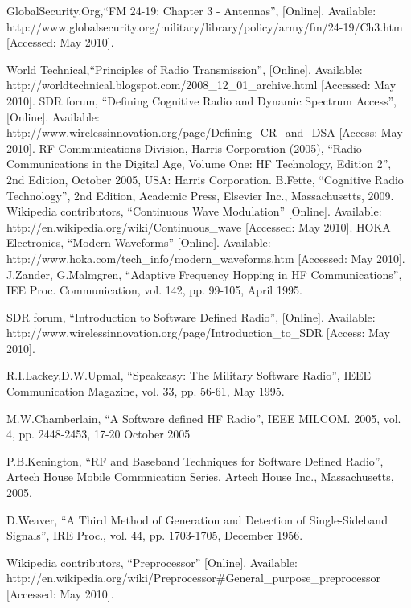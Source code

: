 \documentclass[conference]{IEEEtran}
\begin{document}
%
%
%
\begin{thebibliography}{1}

\bibitem
GlobalSecurity.Org,“FM 24-19: Chapter 3 - Antennas”, [Online]. Available: http://www.globalsecurity.org/military/library/policy/army/fm/24-19/Ch3.htm [Accessed: May 2010].

\bibitem
World Technical,“Principles of Radio Transmission”, [Online]. Available: 
http://worldtechnical.blogspot.com/2008\_12\_01\_archive.html [Accessed: May 2010]. 
\bibitem
SDR forum, “Defining Cognitive Radio and Dynamic Spectrum Access”, [Online]. Available: http://www.wirelessinnovation.org/page/Defining\_CR\_and\_DSA   [Access: May 2010].
\bibitem
RF Communications Division, Harris Corporation (2005), “Radio Communications in the Digital Age, Volume One: HF Technology, Edition 2”, 2nd Edition, October 2005, USA: Harris Corporation.
\bibitem
B.Fette, “Cognitive Radio Technology”, 2nd Edition, Academic Press, Elsevier Inc., Massachusetts, 2009.
\bibitem
Wikipedia contributors, “Continuous Wave Modulation” [Online]. Available: http://en.wikipedia.org/wiki/Continuous\_wave [Accessed: May 2010]. 
\bibitem
HOKA Electronics, “Modern Waveforms” [Online]. Available: http://www.hoka.com/tech\_info/modern\_waveforms.htm [Accessed: May 2010].
\bibitem
J.Zander, G.Malmgren, “Adaptive Frequency Hopping in HF Communications”, IEE Proc. Communication, vol. 142, pp. 99-105, April 1995. 

\bibitem
SDR forum, “Introduction to Software Defined Radio”, [Online]. Available: http://www.wirelessinnovation.org/page/Introduction\_to\_SDR  [Access: May 2010].

\bibitem
R.I.Lackey,D.W.Upmal, “Speakeasy: The Military Software Radio”, IEEE Communication Magazine, vol. 33, pp. 56-61, May 1995.  

\bibitem
M.W.Chamberlain, “A Software defined HF Radio”, IEEE MILCOM. 2005, vol. 4, pp. 2448-2453, 17-20 October 2005 

\bibitem
P.B.Kenington, “RF and Baseband Techniques for Software Defined Radio”, Artech House Mobile Commnication Series, Artech House Inc., Massachusetts, 2005.

\bibitem
D.Weaver, “A Third Method of Generation and Detection of Single-Sideband Signals”, IRE Proc., vol. 44, pp. 1703-1705, December 1956.


\bibitem
Wikipedia contributors, “Preprocessor” [Online]. Available: http://en.wikipedia.org/wiki/Preprocessor\#General\_purpose\_preprocessor   [Accessed: May 2010].

  
\end{thebibliography}



\end{document}

